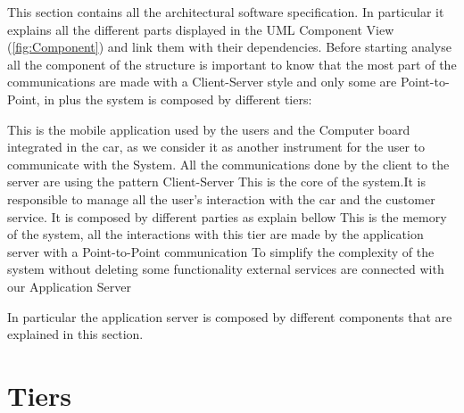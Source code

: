 This section contains all the architectural software specification. In particular it explains all the different parts displayed in the UML Component View (\ref{fig:Component}) and link them with their dependencies. Before starting analyse all the component of the structure is important to know that the most part of the communications are made with a Client-Server style and only some are Point-to-Point, in plus the system is composed by different tiers:
\begin{itemize}
	 This is the mobile application used by the users and the Computer board integrated in the car, as we consider it as another instrument for the user to communicate with the System. All the communications done by the client to the server are using the pattern Client-Server
	 This is the core of the system.It is responsible to manage all the user's interaction with the car and the customer service. It is composed by different parties as explain bellow
	 This is the memory of the system, all the interactions with this tier are made by the application server with a Point-to-Point communication
	 To simplify the complexity of the system without deleting some functionality external services are connected with our Application Server
\end{itemize}
In particular the application server is composed by different components that are explained in this section.

\section{Tiers}
